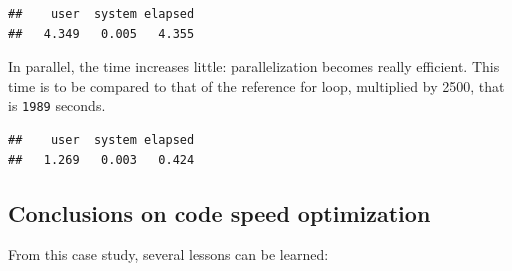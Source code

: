 \documentclass[
  12pt,
  american,
  a4paper,
  extrafontsizes,onecolumn,openright
  ]{memoir}
\newenvironment{Shaded}{\begin{snugshade}}{\end{snugshade}}
\newcommand{\DecValTok}[1]{\textcolor[rgb]{0.00,0.00,0.81}{#1}}
\newcommand{\FunctionTok}[1]{\textcolor[rgb]{0.13,0.29,0.53}{\textbf{#1}}}
\newcommand{\NormalTok}[1]{#1}
\newcommand{\OtherTok}[1]{\textcolor[rgb]{0.56,0.35,0.01}{#1}}
\newcommand{\SpecialCharTok}[1]{\textcolor[rgb]{0.81,0.36,0.00}{\textbf{#1}}}
\begin{document}
\scriptsize

\begin{Shaded}
\end{Shaded}

\begin{verbatim}
##    user  system elapsed 
##   4.349   0.005   4.355
\end{verbatim}

\normalsize

In parallel, the time increases little: parallelization becomes really efficient.
This time is to be compared to that of the reference for loop, multiplied by 2500, that is \texttt{1989} seconds.

\scriptsize

\begin{Shaded}
\end{Shaded}

\begin{verbatim}
##    user  system elapsed 
##   1.269   0.003   0.424
\end{verbatim}

\normalsize

\subsection{Conclusions on code speed optimization}\label{conclusions-on-code-speed-optimization}

From this case study, several lessons can be learned:
\end{document}
